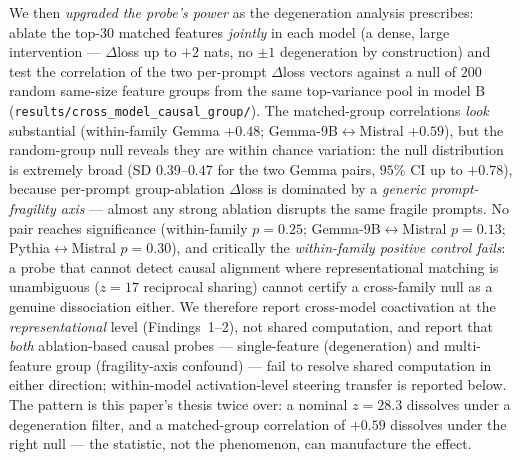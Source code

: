We then \emph{upgraded the probe's power} as the degeneration analysis prescribes: ablate the
top-$30$ matched features \emph{jointly} in each model (a dense, large intervention ---
$\Delta$loss up to $+2$ nats, no $\pm1$ degeneration by construction) and test the correlation
of the two per-prompt $\Delta$loss vectors against a null of $200$ random same-size feature
groups from the same top-variance pool in model B
(\texttt{results/cross\_model\_causal\_group/}). The matched-group correlations \emph{look}
substantial (within-family Gemma $+0.48$; Gemma-9B$\leftrightarrow$Mistral $+0.59$), but the
random-group null reveals they are within chance variation: the null distribution is extremely
broad (SD $0.39$--$0.47$ for the two Gemma pairs, $95\%$ CI up to $+0.78$), because per-prompt group-ablation
$\Delta$loss is dominated by a \emph{generic prompt-fragility axis} --- almost any strong
ablation disrupts the same fragile prompts. No pair reaches significance
(within-family $p=0.25$; Gemma-9B$\leftrightarrow$Mistral $p=0.13$;
Pythia$\leftrightarrow$Mistral $p=0.30$), and critically the \emph{within-family positive
control fails}: a probe that cannot detect causal alignment where representational matching is
unambiguous ($z=17$ reciprocal sharing) cannot certify a cross-family null as a genuine
dissociation either. We therefore report cross-model coactivation at the
\emph{representational} level (Findings~1--2), not shared computation, and report that \emph{both} ablation-based
causal probes --- single-feature (degeneration) and multi-feature group (fragility-axis
confound) --- fail to resolve shared computation in either direction; within-model
activation-level steering transfer is reported below. The pattern is
this paper's thesis twice over: a nominal $z=28.3$ dissolves under a degeneration filter, and
a matched-group correlation of $+0.59$ dissolves under the right null --- the statistic, not
the phenomenon, can manufacture the effect.

